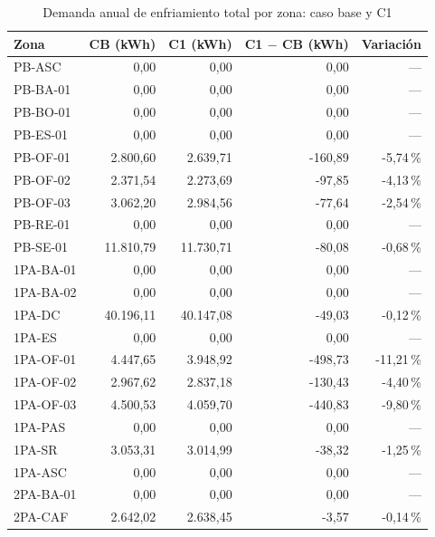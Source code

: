 \begin{table}[H]
\centering
\caption{Demanda anual de enfriamiento total por zona: caso base y C1}
\label{tab:c1-anual}
{\fontsize{9}{11}\selectfont
\begin{tabular}{lrrrr}
\toprule
Zona & CB (kWh) & C1 (kWh) & C1 $-$ CB (kWh) & Variación \\
\midrule
PB-ASC & 0,00 & 0,00 & 0,00 & --- \\
PB-BA-01 & 0,00 & 0,00 & 0,00 & --- \\
PB-BO-01 & 0,00 & 0,00 & 0,00 & --- \\
PB-ES-01 & 0,00 & 0,00 & 0,00 & --- \\
PB-OF-01 & 2.800,60 & 2.639,71 & \textcolor[HTML]{2A9D8F}{-160,89} & \textcolor[HTML]{2A9D8F}{-5,74\,\%} \\
PB-OF-02 & 2.371,54 & 2.273,69 & \textcolor[HTML]{2A9D8F}{-97,85} & \textcolor[HTML]{2A9D8F}{-4,13\,\%} \\
PB-OF-03 & 3.062,20 & 2.984,56 & \textcolor[HTML]{2A9D8F}{-77,64} & \textcolor[HTML]{2A9D8F}{-2,54\,\%} \\
PB-RE-01 & 0,00 & 0,00 & 0,00 & --- \\
PB-SE-01 & 11.810,79 & 11.730,71 & \textcolor[HTML]{2A9D8F}{-80,08} & \textcolor[HTML]{2A9D8F}{-0,68\,\%} \\
1PA-BA-01 & 0,00 & 0,00 & 0,00 & --- \\
1PA-BA-02 & 0,00 & 0,00 & 0,00 & --- \\
1PA-DC & 40.196,11 & 40.147,08 & \textcolor[HTML]{2A9D8F}{-49,03} & \textcolor[HTML]{2A9D8F}{-0,12\,\%} \\
1PA-ES & 0,00 & 0,00 & 0,00 & --- \\
1PA-OF-01 & 4.447,65 & 3.948,92 & \textcolor[HTML]{2A9D8F}{-498,73} & \textcolor[HTML]{2A9D8F}{-11,21\,\%} \\
1PA-OF-02 & 2.967,62 & 2.837,18 & \textcolor[HTML]{2A9D8F}{-130,43} & \textcolor[HTML]{2A9D8F}{-4,40\,\%} \\
1PA-OF-03 & 4.500,53 & 4.059,70 & \textcolor[HTML]{2A9D8F}{-440,83} & \textcolor[HTML]{2A9D8F}{-9,80\,\%} \\
1PA-PAS & 0,00 & 0,00 & 0,00 & --- \\
1PA-SR & 3.053,31 & 3.014,99 & \textcolor[HTML]{2A9D8F}{-38,32} & \textcolor[HTML]{2A9D8F}{-1,25\,\%} \\
1PA-ASC & 0,00 & 0,00 & 0,00 & --- \\
2PA-BA-01 & 0,00 & 0,00 & 0,00 & --- \\
2PA-CAF & 2.642,02 & 2.638,45 & \textcolor[HTML]{2A9D8F}{-3,57} & \textcolor[HTML]{2A9D8F}{-0,14\,\%} \\

\end{tabular}}
\end{table}
